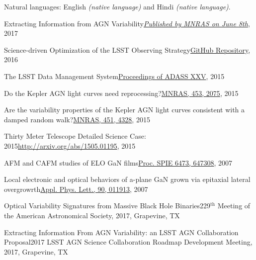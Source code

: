 \documentclass[10pt,a4paper]{article}
\begin{document}
\vspace{1.0em}

\inlineheadsection
  {Natural languages:}
  {English \emph{(native language)} and Hindi \emph{(native language)}.}


\spacedhrule{1.6em}{-0.8em}



\inlineheadsection
  {Extracting Information from AGN Variability}{\href{https://doi.org/10.1093/mnras/stx1420}{\textit{Published by MNRAS on June 8th}}, 2017}

\inlineheadsection
  {Science-driven Optimization of the LSST Observing Strategy}{\href{https://github.com/LSSTScienceCollaborations/ObservingStrategy}{GitHub Repository}, 2016}

\inlineheadsection
  {The LSST Data Management System}{\href{http://adsabs.harvard.edu/cgi-bin/bib_query?arXiv:1512.07914}{Proceedings of ADASS XXV}, 2015}

\inlineheadsection
  {Do the Kepler AGN light curves need reprocessing?}{\href{http://dx.doi.org/10.1093/mnras/stv1797}{MNRAS, 453, 2075}, 2015}

\inlineheadsection
  {Are the variability properties of the Kepler AGN light curves consistent with a damped random walk?}{\href{http://dx.doi.org/ 10.1093/mnras/stv1230}{MNRAS, 451, 4328}, 2015}

\inlineheadsection
 {Thirty Meter Telescope Detailed Science Case: 2015}{\href{http://arxiv.org/abs/1505.01195}{http://arxiv.org/abs/1505.01195}, 2015}

\inlineheadsection
  {AFM and CAFM studies of ELO GaN films}{\href{http://dx.doi.org/10.1117/12.706773}{Proc. SPIE 6473, 647308}, 2007}

\inlineheadsection
  {Local electronic and optical behaviors of a-plane GaN grown via epitaxial lateral overgrowrth}{\href{http://dx.doi.org/10.1063/1.2429901}{Appl. Phys. Lett., 90, 011913}, 2007}


\spacedhrule{1.0em}{-0.4em}



\inlineheadsection
  {Optical Variability Signatures from Massive Black Hole Binaries}{229$^{\mathrm{th}}$ Meeting of the American Astronomical Society, 2017, Grapevine, TX}

\inlineheadsection
  {Extracting Information From AGN Variability: an LSST AGN Collaboration Proposal}{2017 LSST AGN Science Collaboration Roadmap Development Meeting, 2017, Grapevine, TX}
\end{document}
